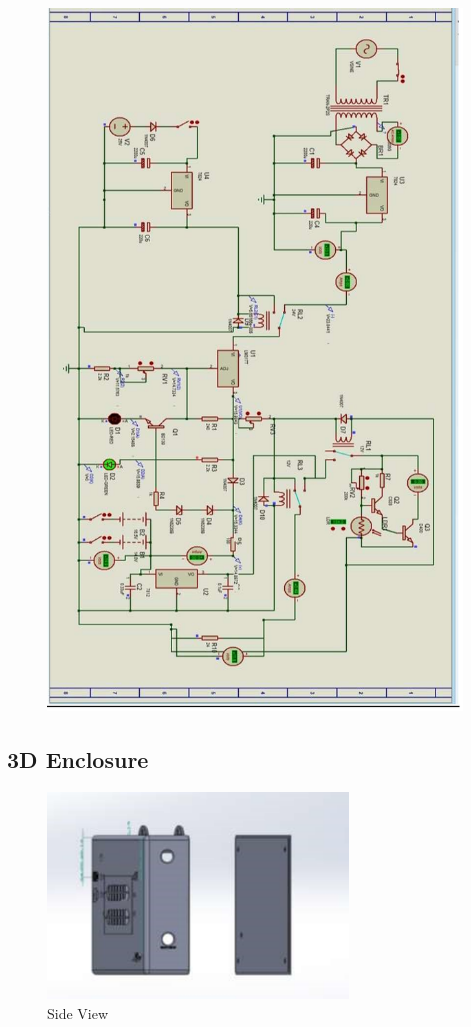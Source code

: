 \documentclass[twocolumn]{article}
\begin{document}
\begin{titlepage}
        \begin{figure}[h]
            \centering
            \includegraphics[width = 11cm]{16.png}
            \label{fig:enter-label}
        \end{figure}

    \newpage
    
    \subsection*{3D Enclosure}

    \begin{figure}[h]
        \begin{minipage}{0.6\textwidth}
            \includegraphics[width=8cm]{17.png}
        \end{minipage}
        \hfill
        \begin{minipage}{0.35\textwidth}
            \caption{Side View}
            \label{fig:enter-label}
        \end{minipage}
    \end{figure}


\end{titlepage}
\end{document}
